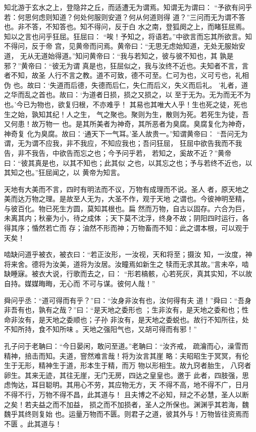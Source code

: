 \documentclass[a4paper,12pt,UTF8,twoside]{ctexbook}
\begin{document}
知北游于玄水之上，登隐弅之丘，而适遭无为谓焉。知谓无为谓曰： “予欲有问乎若：何思何虑则知道？何处何服则安道？何从何道则得 道？”三问而无为谓不答也。非不答，不知答也。知不得问，反于白 水之南，登狐阕之上，而睹狂屈焉。知以之言也问乎狂屈。狂屈曰： “唉！予知之，将语若。”中欲言而忘其所欲言。知不得问，反于帝 宫，见黄帝而问焉。黄帝曰：“无思无虑始知道，无处无服始安道， 无从无道始得道。”知问黄帝曰：“我与若知之，彼与彼不知也，其 孰是邪？”黄帝曰：“彼无为谓 真是也，狂屈似之，我与汝终不近也。夫知者不言，言者不知，故圣 人行不言之教。道不可致，德不可至。仁可为也，义可亏也，礼相伪 也。故曰：‘失道而后德，失德而后仁，失仁而后义，失义而后礼。 ’礼者，道之华而乱之首也。故曰：‘为道者日损，损之又损之，以 至于无为。无为而无不为也。’今已为物也，欲复归根，不亦难乎！ 其易也其唯大人乎！生也死之徒，死也生之始，孰知其纪！人之生， 气之聚也。聚则为生，散则为死。若死生为徒，吾又何患！故万物一 也。是其所美者为神奇，其所恶者为臭腐。臭腐复化为神奇，神奇复 化为臭腐。故曰：‘通天下一气耳。’圣人故贵一。”知谓黄帝曰： “吾问无为谓，无为谓不应我，非不我应，不知应我也；吾问狂屈， 狂屈中欲告我而不我告，非不我告，中欲告而忘之也；今予问乎若， 若知之，奚故不近？”黄帝曰：“彼其真是也，以其不知也；此其似 之也，以其忘之也；予与若终不近也，以其知之也。”狂屈闻之，以 黄帝为知言。

天地有大美而不言，四时有明法而不议，万物有成理而不说。圣人 者，原天地之美而达万物之理。是故至人无为，大圣不作，观于天地 之谓也。今彼神明至精，与彼百化。物已死生方圆，莫知其根也。扁 然而万物，自古以固存。六合为巨，未离其内；秋豪为小，待之成体 ；天下莫不沈浮，终身不故；阴阳四时运行，各得其序；惛然若亡而 存；油然不形而神；万物畜而不知：此之谓本根，可以观于天矣！

啮缺问道乎被衣，被衣曰：“若正汝形，一汝视，天和将至；摄汝 知，一汝度，神将来舍。德将为汝美，道将为汝居。汝瞳焉如新生之 犊而无求其故。”言未卒，啮缺睡寐。被衣大说，行歌而去之，曰： “形若槁骸，心若死灰，真其实知，不以故自持。媒媒晦晦，无心而 不可与谋。彼何人哉！”

舜问乎丞：“道可得而有乎？”曰：“汝身非汝有也，汝何得有夫 道！”舜曰：“吾身非吾有也，孰有之哉？”曰：“是天地之委形也 ；生非汝有，是天地之委和也；性命非汝有，是天地之委顺也；子孙 非汝有，是天地之委蜕也。故行不知所往，处不知所持，食不知所味 。天地之强阳气也，又胡可得而有邪！”

孔子问于老聃曰：“今日晏闲，敢问至道。”老聃曰：“汝齐戒， 疏瀹而心，澡雪而精神，掊击而知。夫道，窨然难言哉！将为汝言其崖 略：夫昭昭生于冥冥，有伦生于无形，精神生于道，形本生于精，而万 物以形相生。故九窍者胎生， 八窍者卵生。其来无迹，其往无崖，无门无房，四达之皇皇也。邀于 此者，四肢强，思虑恂达，耳目聪明。其用心不劳，其应物无方，天 不得不高，地不得不广，日月不得不行，万物不得不昌，此其道与！ 且夫博之不必知，辩之不必慧，圣人以断之矣！若夫益之而不加益， 损之而不加损者，圣人之所保也。渊渊乎其若海，魏魏乎其终则复始 也。运量万物而不匮。则君子之道，彼其外与！万物皆往资焉而不匮 。此其道与！
\end{document}
